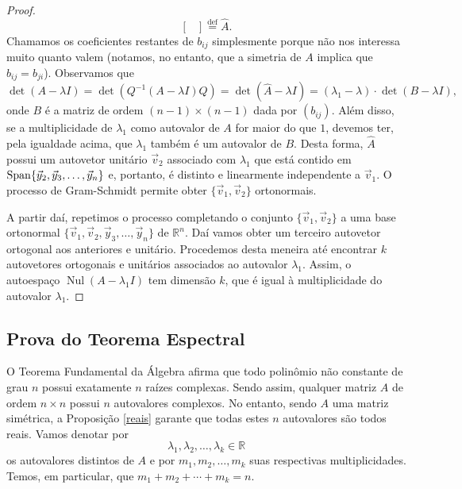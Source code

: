 \documentclass[../livro.tex]{subfiles}
\begin{document}
\begin{proof}
\begin{equation}
\begin{bmatrix}
	\end{bmatrix} \stackrel{\text{def}}{=} \hat{A}.
	\end{equation} Chamamos os coeficientes restantes de $b_{ij}$ simplesmente porque não nos interessa muito quanto valem (notamos, no entanto, que a simetria de $A$ implica que $b_{ij} = b_{ji}$). Observamos que 
	\begin{equation}
	\det \left( A - \lambda I \right) = \det \left( Q^{-1} (A - \lambda I) Q \right) =	\det \left( \hat{A} - \lambda I \right) = (\lambda_1 - \lambda) \cdot \det (B - \lambda I),
	\end{equation} onde $B$ é a matriz de ordem $(n-1)\times (n-1)$ dada por $(b_{ij})$. Além disso, se a multiplicidade de $\lambda_1$ como autovalor de $A$ for maior do que $1$, devemos ter, pela igualdade acima, que $\lambda_1$ também é um autovalor de $B$. Desta forma, $\hat{A}$ possui um autovetor unitário $\vec{v}_2$ associado com $\lambda_1$ que está contido em $\operatorname{Span} \{ \vec{y}_2, \vec{y}_3, \dots, \vec{y}_n \}$ e, portanto, é distinto e linearmente independente a $\vec{v}_1$. O processo de Gram-Schmidt permite obter $\{\vec{v}_1, \vec{v}_2\}$ ortonormais.
	
	A partir daí, repetimos o processo completando o conjunto $\{\vec{v}_1, \vec{v}_2\}$ a uma base ortonormal $\{ \vec{v}_1, \vec{v}_2, \vec{y}_3, \dots, \vec{y}_n \}$ de $\mathbb{R}^n$. Daí vamos obter um terceiro autovetor ortogonal aos anteriores e unitário. Procedemos desta meneira até encontrar $k$ autovetores ortogonais e unitários associados ao autovalor $\lambda_1$. Assim, o autoespaço $\operatorname{Nul} (A - \lambda_1 I)$ tem dimensão $k$, que é igual à multiplicidade do autovalor $\lambda_1$.
\end{proof}

\subsection{Prova do Teorema Espectral}

O Teorema Fundamental da Álgebra afirma que todo polinômio não constante de grau $n$ possui exatamente $n$ raízes complexas. Sendo assim, qualquer matriz $A$ de ordem $n\times n$ possui $n$ autovalores complexos. No entanto, sendo $A$ uma matriz simétrica, a Proposição \ref{reais} garante que todas estes $n$ autovalores são todos reais. Vamos denotar por
\begin{equation}
\lambda_1, \lambda_2, \dots, \lambda_k \in \mathbb{R}
\end{equation} os autovalores distintos de $A$ e por $m_1, m_2, \dots, m_k$ suas respectivas multiplicidades. Temos, em particular, que $m_1 + m_2 + \cdots + m_k = n$.
\end{document}
